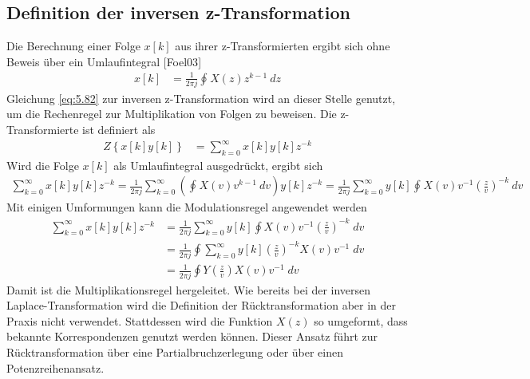 \subsection{Definition der inversen z-Transformation}\label{sec:definition-der-inversen-z-transformation}

Die Berechnung einer Folge \(x[k]\) aus ihrer z-Transformierten ergibt sich ohne Beweis über ein Umlaufintegral {[}Foel03{]}
\begin{align}
x[ k] &= \frac{1}{2  \pi  j}  \oint_{}^{}{X(z)  z^{k - 1}\ dz} \label{eq:5.82}
\end{align}
Gleichung \eqref{eq:5.82} zur inversen z-Transformation wird an dieser Stelle genutzt, um die Rechenregel zur Multiplikation von Folgen zu beweisen. Die z-Transformierte ist definiert als
\begin{align}
Z\left\{ x[ k]  y[ k] \right\} &= \sum\limits_{k = 0}^{\infty}{x[ k]  y[ k]  z^{- k}} \label{eq:5.83}
\end{align}
Wird die Folge \(x[k]\) als Umlaufintegral ausgedrückt, ergibt sich
\begin{align}
{\sum\limits_{k = 0}^{\infty}{x[ k]  y[ k]  z^{- k}} = \frac{1}{2  \pi  j}  \sum\limits_{k = 0}^{\infty}{\left( \oint_{}^{}{X(v)  v^{k - 1}\ dv} \right)  y[ k]  z^{- k}}
}{		 = \frac{1}{2  \pi  j}  \sum\limits_{k = 0}^{\infty}{y[ k]  \oint_{}^{}{X(v)  v^{- 1}  \left( \frac{z}{v} \right)^{- k}\ dv}}} \label{eq:5.84}
\end{align}
Mit einigen Umformungen kann die Modulationsregel angewendet werden
\begin{align}
{\sum\limits _{k=0}^{\infty }x\left[k\right] y\left[k\right] z^{-k}  } &=  {\frac{1}{2 \pi  j}  \sum\limits _{k=0}^{\infty }y\left[k\right] \oint X\left(v\right) v^{-1}  \left(\frac{z}{v} \right)^{-k} {\; }dv  } \\
{} &=  {\frac{1}{2 \pi  j}  \oint \sum\limits _{k=0}^{\infty }y\left[k\right] \left(\frac{z}{v} \right)^{-k}   X\left(v\right) v^{-1} {\; }dv } \\
{} &=  {\frac{1}{2 \pi  j}  \oint Y\left(\frac{z}{v} \right) X\left(v\right) v^{-1} {\; }dv }
\label{eq:5.85}
\end{align}
Damit ist die Multiplikationsregel hergeleitet. Wie bereits bei der inversen Laplace-Transformation wird die Definition der Rücktransformation aber in der Praxis nicht verwendet. Stattdessen wird die Funktion \(X(z)\) so umgeformt, dass bekannte Korrespondenzen genutzt werden können. Dieser Ansatz führt zur Rücktransformation über eine Partialbruchzerlegung oder über einen Potenzreihenansatz.


